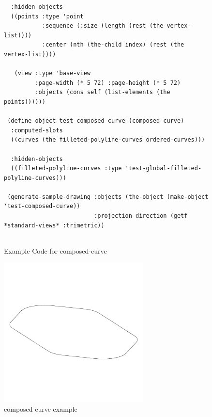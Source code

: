 \documentclass [11pt]{book}
\begin{document}
\begin{itemize}
\begin{figure}
\begin{lrbox}{\boxedverb}
\begin{minipage}{\linewidth}
{\begin{verbatim}
  :hidden-objects
  ((points :type 'point
           :sequence (:size (length (rest (the vertex-list))))
           :center (nth (the-child index) (rest (the vertex-list))))

   (view :type 'base-view
         :page-width (* 5 72) :page-height (* 5 72)
         :objects (cons self (list-elements (the points))))))

 (define-object test-composed-curve (composed-curve)
  :computed-slots
  ((curves (the filleted-polyline-curves ordered-curves)))
  
  :hidden-objects
  ((filleted-polyline-curves :type 'test-global-filleted-polyline-curves)))

 (generate-sample-drawing :objects (the-object (make-object 'test-composed-curve))
                          :projection-direction (getf *standard-views* :trimetric))


\end{verbatim}}
\end{minipage}
\end{lrbox}
\fbox{\usebox{\boxedverb}}

\caption{Example Code for composed-curve}

\label{fig:example-code-composed-curve}

\end{figure}

\begin{figure}
\begin{center}
\includegraphics[width=3in,height=3in]{../images/example-composed-curve.pdf}
\end{center}

\caption{composed-curve example}

\label{fig:composed-curve}

\end{figure}






\end{itemize}
\end{document}
